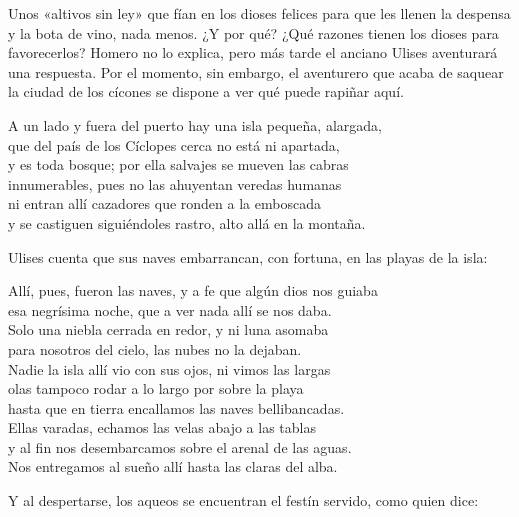 Unos «altivos sin ley» que fían en los dioses felices para que les llenen la despensa y la bota de vino, nada menos. ¿Y por qué? ¿Qué razones tienen los dioses para favorecerlos? Homero no lo explica, pero más tarde el anciano Ulises aventurará una respuesta. Por el momento, sin embargo, el aventurero que acaba de saquear la ciudad de los cícones se dispone a ver qué puede rapiñar aquí.

\begin{versocita}
A un lado y fuera del puerto hay una isla pequeña, alargada,\\
que del país de los Cíclopes cerca no está ni apartada,\\
y es toda bosque; por ella salvajes se mueven las cabras\\
innumerables, pues no las ahuyentan veredas humanas\\
ni entran allí cazadores que ronden a la emboscada\\
y se castiguen siguiéndoles rastro, alto allá en la montaña.
\end{versocita}

Ulises cuenta que sus naves embarrancan, con fortuna, en las playas de la isla:

\begin{versocita}
Allí, pues, fueron las naves, y a fe que algún dios nos guiaba\\
esa negrísima noche, que a ver nada allí se nos daba.\\
Solo una niebla cerrada en redor, y ni luna asomaba\\
para nosotros del cielo, las nubes no la dejaban.\\
Nadie la isla allí vio con sus ojos, ni vimos las largas\\
olas tampoco rodar a lo largo por sobre la playa\\
hasta que en tierra encallamos las naves bellibancadas.\\
Ellas varadas, echamos las velas abajo a las tablas\\
y al fin nos desembarcamos sobre el arenal de las aguas.\\
Nos entregamos al sueño allí hasta las claras del alba.
\end{versocita}

Y al despertarse, los aqueos se encuentran el festín servido, como quien dice:

